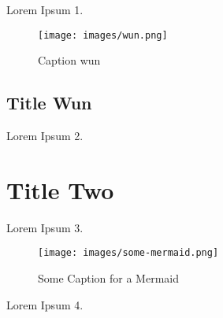 Lorem Ipsum 1.

\begin{figure}
\centering
\texttt{[image: images/wun.png]}
\caption{Caption wun \label{fig:wun}}
\end{figure}

\newpage

\hypertarget{title-wun}{%
\subsection{Title Wun}\label{title-wun}}

Lorem Ipsum 2.

\hypertarget{title-two}{%
\section{Title Two}\label{title-two}}

Lorem Ipsum 3.


\begin{figure}
\centering
\texttt{[image: images/some-mermaid.png]}
\caption{Some Caption for a Mermaid \label{fig:some-mermaid}}
\end{figure}

\newpage

Lorem Ipsum 4.
